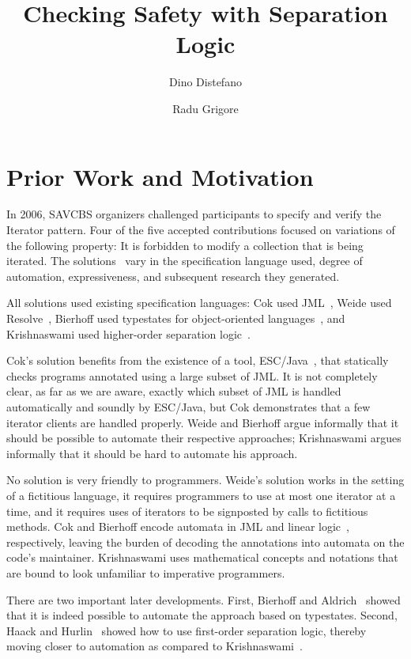 \documentclass[a4paper]{article}
\title{Checking Safety with Separation Logic}
\author{Dino Distefano \and Radu Grigore}
\theoremstyle{slanted}
\theoremstyle{definition}
\theoremstyle{remark}
\begin{document}
\maketitle

\section{Prior Work and Motivation}

In 2006, SAVCBS organizers challenged participants to specify and verify the Iterator pattern.
Four of the five accepted contributions focused on variations of the following property:
It is forbidden to modify a collection that is being iterated.
The solutions~\cite{cok2006,weide2006,bierhoff2006,krishnaswami2006} vary in the specification language used, degree of automation, expressiveness, and subsequent research they generated.

All solutions used existing specification languages:
Cok used JML~\cite{jml}, Weide used Resolve~\cite{resolve}, Bierhoff used typestates for object-oriented languages~\cite{deline2004}, and Krishnaswami used higher-order separation logic~\cite{biering2007}.

Cok's solution benefits from the existence of a tool, ESC/Java~\cite{escjava}, that statically checks programs annotated using a large subset of JML\null.
It is not completely clear, as far as we are aware, exactly which subset of JML is handled automatically and soundly by ESC/Java, but Cok demonstrates that a few iterator clients are handled properly.
Weide and Bierhoff argue informally that it should be possible to automate their respective approaches;
Krishnaswami argues informally that it should be hard to automate his approach.

No solution is very friendly to programmers. 
Weide's solution works in the setting of a fictitious language, it requires programmers to use at most one iterator at a time, and it requires uses of iterators to be signposted by calls to fictitious methods.
Cok and Bierhoff encode automata in JML and linear logic~\cite{girard1987}, respectively, leaving the burden of decoding the annotations into automata on the code's maintainer.
Krishnaswami uses mathematical concepts and notations that are bound to look unfamiliar to imperative programmers.

There are two important later developments. First, Bierhoff and Aldrich~\cite{bierhoff2007} showed that it is indeed possible to automate the approach based on typestates. Second, Haack and Hurlin~\cite{haack2009} showed how to use first-order separation logic, thereby moving closer to automation as compared to Krishnaswami~\cite{krishnaswami2006}.
\end{document}
